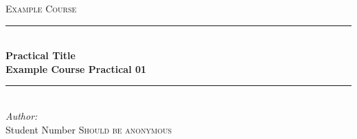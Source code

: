 \documentclass[11pt, a4paper]{article}
\def\thepretitle{Example Course}
\def\themaintitle{Practical Title}
\def\thesubtitle{Example Course Practical 01}
\def\firstname{Student Number}
\def\lastname{Should be anonymous}
\newcommand{\HRule}{\rule{\linewidth}{0.5mm}} %
\begin{document}
\begin{center}
\textsc{\LARGE \thepretitle}\\[0.75cm]

\HRule \\[0.4cm]
{ \huge \bfseries \themaintitle}\\[0.5cm]
{ \large \bfseries \thesubtitle}\\
\HRule \\[0.75cm]

\emph{Author:}\\

\firstname\textsc{ \lastname}\\

\end{center}







\onecolumn
\newpage
{}
\appendix
\appendixpage

\newpage
%


\end{document}
